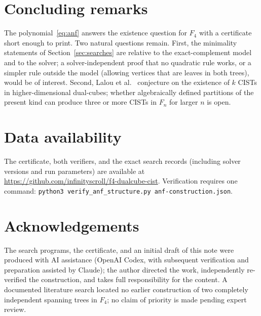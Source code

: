 \documentclass[11pt]{article}
\theoremstyle{remark}
\begin{document}
\section{Concluding remarks}

The polynomial~\eqref{eq:anf} answers the existence question for $F_4$ with
a certificate short enough to print. Two natural questions remain. First,
the minimality statements of Section~\ref{sec:searches} are relative to the
exact-complement model and to the solver; a solver-independent proof that
no quadratic rule works, or a simpler rule outside the model (allowing
vertices that are leaves in both trees), would be of interest. Second,
Lalou et al.~\cite{Lalou2026} conjecture on the existence of $k$ CISTs in
higher-dimensional dual-cubes; whether algebraically defined partitions of
the present kind can produce three or more CISTs in $F_n$ for larger $n$ is
open.

\section*{Data availability}

The certificate, both verifiers, and the exact search records (including
solver versions and run parameters) are available at
\url{https://github.com/infinityscroll/f4-dualcube-cist}.
Verification requires one command:
\texttt{python3 verify\_anf\_structure.py anf-construction.json}.

\section*{Acknowledgements}

The search programs, the certificate, and an initial draft of this note
were produced with AI assistance (OpenAI Codex, with subsequent
verification and preparation assisted by Claude); the author directed the
work, independently re-verified the construction, and takes full
responsibility for the content. A documented literature search located no
earlier construction of two completely independent spanning trees in
$F_4$; no claim of priority is made pending expert review.
\end{document}
